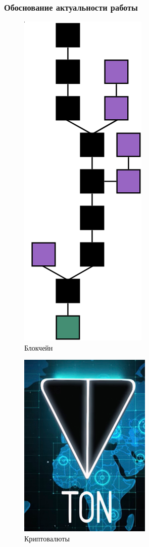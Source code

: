 \documentclass{beamer}
\begin{document}
\begin{frame}[c]
    \frametitle{Обоснование актуальности работы}

    \begin{multicols}{2}
    \begin{figure}
        \includegraphics[height=0.8\columnwidth]{blockchain.png}
        \captionsetup{labelformat=empty}
        \caption{Блокчейн}
    \end{figure}

        \columnbreak

        \begin{figure}
            \includegraphics[height=0.8\columnwidth]{ton.png}
            \captionsetup{labelformat=empty}
            \caption{Криптовалюты}
        \end{figure}
    \end{multicols}
\end{frame}
\end{document}
